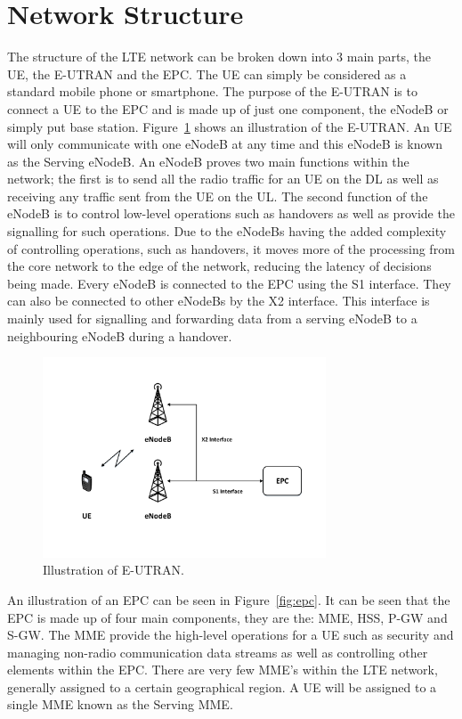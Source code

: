 \section{Network Structure}\label{network structure}
The structure of the LTE network can be broken down into 3 main parts, the \ac{UE}, the \ac{E-UTRAN} and the \ac{EPC}. The UE can simply be considered as a standard mobile phone or smartphone. The purpose of the E-UTRAN is to connect a UE to the EPC and is made up of just one component, the \ac{eNodeB} or simply put base station. Figure~\ref{fig:eutran} shows an illustration of the E-UTRAN. An UE will only communicate with one eNodeB at any time and this eNodeB is known as the Serving eNodeB. An eNodeB proves two main functions within the network; the first is to send all the radio traffic for an UE on the DL as well as receiving any traffic sent from the UE on the UL. The second function of the eNodeB is to control low-level operations such as handovers as well as provide the signalling for such operations. Due to the eNodeBs having the added complexity of controlling operations, such as handovers, it moves more of the processing from the core network to the edge of the network, reducing the latency of decisions being made. Every eNodeB is connected to the EPC using the S1 interface. They can also be connected to other eNodeBs by the X2 interface. This interface is mainly used for signalling and forwarding data from a serving eNodeB to a neighbouring eNodeB during a handover.
\begin{figure}[H]
  \begin{center}
    	  \includegraphics[width=0.75\textwidth]{figures/lte/eutran.pdf}
    \end{center}
    \caption{Illustration of E-UTRAN.}
    \label{fig:eutran}
\end{figure}
An illustration of an EPC can be seen in Figure~\ref{fig:epc}. It can be seen that the EPC is made up of four main components, they are the: \ac{MME}, \ac{HSS}, \ac{P-GW} and \ac{S-GW}. 
The MME provide the high-level operations for a UE such as security and managing non-radio communication data streams as well as controlling other elements within the EPC. There are very few MME's within the LTE network, generally assigned to a certain geographical region. A UE will be assigned to a single MME known as the Serving MME. 

